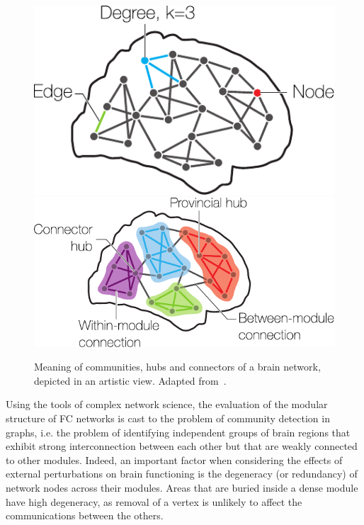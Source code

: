 \begin{figure}[htb!]
\centering
\hfill\includegraphics[height=0.25\textwidth]{images/brain_network_basics.pdf}\hfill
\includegraphics[height=0.25\textwidth]{images/brain_network_communities.pdf}\hfill
\caption{Meaning of communities, hubs and connectors of a brain network, depicted in an artistic view.
Adapted from~\cite{sporns2016}.}
\label{fig:brain_network_communities}
\end{figure}


%


Using the tools of complex network science, the evaluation of the modular structure of FC networks is cast to the problem of community detection in graphs, i.e.
the problem of identifying independent groups of brain regions that exhibit strong interconnection between each other but that are weakly connected to other modules.
Indeed, an important factor when considering the effects of external perturbations on brain functioning is the degeneracy (or redundancy) of network nodes across their modules.
Areas that are buried inside a dense module have high degeneracy, as removal of a vertex is unlikely to affect the communications between the others.

